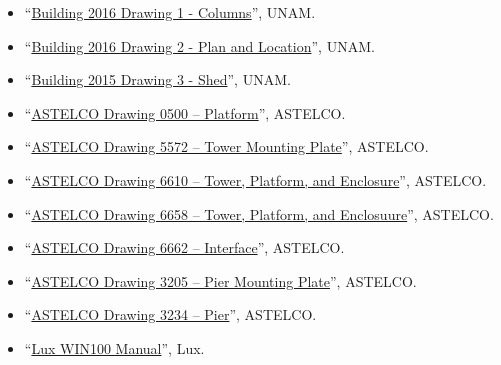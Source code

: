 \begin{flushleft}
\begin{itemize}
\ifddotioan
\item “\href{bibliography/unam-ddoti-building-drawing-2016-1.pdf}{Building 2016 Drawing 1 - Columns}”, UNAM.
\item “\href{bibliography/unam-ddoti-building-drawing-2016-2.pdf}{Building 2016 Drawing 2 - Plan and Location}”, UNAM.
\item “\href{bibliography/unam-ddoti-building-drawing-2016-3.pdf}{Building 2015 Drawing 3 - Shed}”, UNAM.
\item “\href{bibliography/astelco-enclosure-drawing-0500}{ASTELCO Drawing 0500 -- Platform}”, ASTELCO.
\item “\href{bibliography/astelco-enclosure-drawing-5772}{ASTELCO Drawing 5572 -- Tower Mounting Plate}”, ASTELCO.
\item “\href{bibliography/astelco-enclosure-drawing-5772}{ASTELCO Drawing 6610 --  Tower, Platform, and Enclosure}”, ASTELCO.
\item “\href{bibliography/astelco-enclosure-drawing-5772}{ASTELCO Drawing 6658 -- Tower, Platform, and Enclosuure}”, ASTELCO.
\item “\href{bibliography/astelco-enclosure-drawing-5772}{ASTELCO Drawing 6662 -- Interface}”, ASTELCO.
\item “\href{bibliography/astelco-ddoti-pier-drawing-3205}{ASTELCO Drawing 3205 -- Pier Mounting Plate}”, ASTELCO.
\item “\href{bibliography/astelco-ddoti-pier-drawing-3205}{ASTELCO Drawing 3234 -- Pier}”, ASTELCO.
\fi

\item “\href{bibliography/lux-win100-manual}{Lux WIN100 Manual}”, Lux.

\end{itemize}
\end{flushleft}
